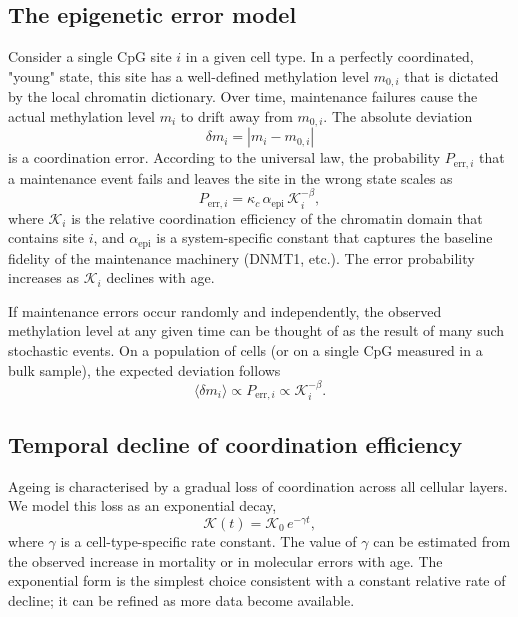 \documentclass[12pt,a4paper]{article}
\newcommand{\REL}{\mathcal{K}}          %
\begin{document}
	\subsection{The epigenetic error model}
	Consider a single CpG site \(i\) in a given cell type. In a perfectly coordinated, "young" state, this site has a well-defined methylation level \(m_{0,i}\) that is dictated by the local chromatin dictionary. Over time, maintenance failures cause the actual methylation level \(m_i\) to drift away from \(m_{0,i}\). The absolute deviation
	\[
	\delta m_i = |m_i - m_{0,i}|
	\]
	is a coordination error. According to the universal law, the probability \(P_{\mathrm{err},i}\) that a maintenance event fails and leaves the site in the wrong state scales as
	\begin{equation}
		P_{\mathrm{err},i} = \kappa_c \, \alpha_{\mathrm{epi}} \, \REL_i^{-\beta},
		\label{eq:perr}
	\end{equation}
	where \(\REL_i\) is the relative coordination efficiency of the chromatin domain that contains site \(i\), and \(\alpha_{\mathrm{epi}}\) is a system-specific constant that captures the baseline fidelity of the maintenance machinery (DNMT1, etc.). The error probability increases as \(\REL_i\) declines with age.
	
	If maintenance errors occur randomly and independently, the observed methylation level at any given time can be thought of as the result of many such stochastic events. On a population of cells (or on a single CpG measured in a bulk sample), the expected deviation follows
	\[
	\langle \delta m_i \rangle \propto P_{\mathrm{err},i} \propto \REL_i^{-\beta}.
	\]
	
	\subsection{Temporal decline of coordination efficiency}
	Ageing is characterised by a gradual loss of coordination across all cellular layers. We model this loss as an exponential decay,
	\begin{equation}
		\REL(t) = \REL_0 \, e^{-\gamma t},
		\label{eq:Kdecay}
	\end{equation}
	where \(\gamma\) is a cell-type-specific rate constant. The value of \(\gamma\) can be estimated from the observed increase in mortality or in molecular errors with age. The exponential form is the simplest choice consistent with a constant relative rate of decline; it can be refined as more data become available.
	
\end{document}
